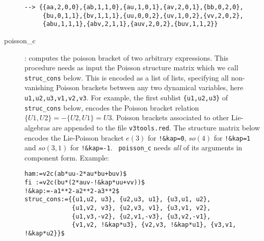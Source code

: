 \documentclass[12pt]{article}
\begin{document}
\begin{description}
\begin{verbatim}
--> {{aa,2,0,0},{ab,1,1,0},{au,1,0,1},{av,2,0,1},{bb,0,2,0},
     {bu,0,1,1},{bv,1,1,1},{uu,0,0,2},{uv,1,0,2},{vv,2,0,2},
     {abu,1,1,1},{abv,2,1,1},{auv,2,0,2},{buv,1,1,2}} \end{verbatim}
  \item[poisson\_c] :
     computes the poisson bracket of two arbitrary expressions. This
     procedure needs as input the Poisson structure matrix which we
     call {\tt struc\_cons} below. This is encoded as a list of lists,
     specifying all non-vanishing Poisson brackets between any two
     dynamical variables, here {\tt u1,u2,u3,v1,v2,v3}. For example,
     the first sublist {\tt \{u1,u2,u3\}} of {\tt struc\_cons} below,
     encodes the Poisson bracket relation $\{U1,U2\}=-\{U2,U1\}=U3$.
     Poisson brackets associated to other Lie-algebras are appended to
     the file {\tt v3tools.red}. The structure matrix below encodes
     the Lie-Poisson bracket $e(3)$ for {\tt !\&kap=0}, $so(4)$ for
     {\tt !\&kap=1} and $so(3,1)$ for {\tt !\&kap=-1}.  {\tt
     poisson\_c} needs {\it all} of its arguments in component form.
     Example: \begin{verbatim}
ham:=v2c(ab*uu-2*au*bu+buv)$
fi :=v2c(bu*(2*auv-!&kap*uu+vv))$
!&kap:=-a1**2-a2**2-a3**2$
struc_cons:={{u1,u2, u3}, {u2,u3, u1}, {u3,u1, u2},
             {u1,v2, v3}, {u2,v3, v1}, {u3,v1, v2},
             {u1,v3,-v2}, {u2,v1,-v3}, {u3,v2,-v1},
             {v1,v2, !&kap*u3}, {v2,v3, !&kap*u1}, {v3,v1, !&kap*u2}}$


\end{verbatim}
\end{description}
\end{document}

